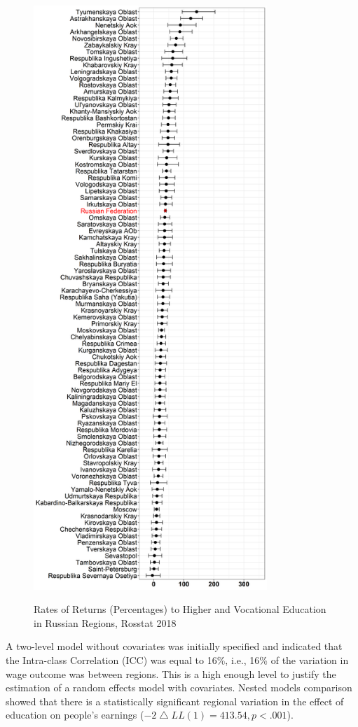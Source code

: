 \documentclass[12pt,a4paper]{article}
\numberwithin{equation}{section}
\begin{document}
\begin{figure}[htp]
\begin{minipage}[b]{.5\linewidth}
		\includegraphics[width=250pt]{reg_ve_18.png}
		\label{}
	\end{minipage}
	\caption{Rates of Returns (Percentages) to Higher and Vocational Education in Russian Regions, Rosstat 2018}\label{fig:4.1}
\end{figure}

A two-level model without covariates was initially specified and indicated that the Intra-class Correlation (ICC) was equal to 16\%, i.e., 16\% of the variation in wage outcome was between regions. This is a high enough level to justify the estimation of a random effects model with covariates. Nested models comparison showed that there is a statistically significant regional variation in the effect of education on people's earnings ($-2\bigtriangleup LL(1) = 413.54, p < .001$).
\end{document}
